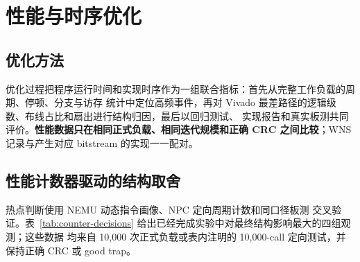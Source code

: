 \section{性能与时序优化}\label{sec:optimization}

\subsection{优化方法}

优化过程把程序运行时间和实现时序作为一组联合指标：首先从完整工作负载的周期、停顿、分支与访存
统计中定位高频事件，再对 Vivado 最差路径的逻辑级数、布线占比和扇出进行结构归因，最后以回归测试、
实现报告和真实板测共同评价。\textbf{性能数据只在相同正式负载、相同迭代规模和正确 CRC 之间比较}；WNS
记录与产生对应 bitstream 的实现一一配对。



\subsection{性能计数器驱动的结构取舍}

热点判断使用 NEMU 动态指令画像、NPC 定向周期计数和同口径板测
交叉验证。表~\ref{tab:counter-decisions} 给出已经完成实验中对最终结构影响最大的四组观测；这些数据
均来自 10,000 次正式负载或表内注明的 10,000-call 定向测试，并保持正确 CRC 或 good trap。

